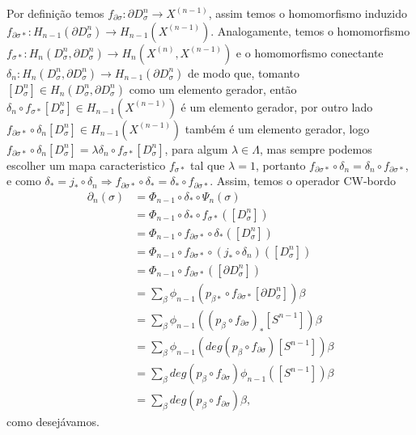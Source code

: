 \documentclass[12pt]{book}
\newcommand{\celula}[2]{D^{#1}_{#2}}
\newcommand{\celulabordo}[2]{\partial D^{#1}_{#2}}
\newcommand{\homologia}[2]{H_{#1}(#2)}
\newcommand{\homologiarelcel}[3]{H_{#1}(D^{#2}_{#3}, \partial D^{#2}_{#3})}
\newcommand{\homologiarelskelesimpl}[2]{H_{#1}(X^{(#2)}, X^{(#2-1)})}
\newcommand{\skeleton}[1]{X^{(#1)}}
\begin{document}
{	Por definição temos $f_{\partial\sigma}: \celulabordo{n}{\sigma} \to \skeleton{n-1}$, assim temos o homomorfismo induzido $f_{\partial\sigma*}: \homologia{n-1}{\celulabordo{n}{\sigma} }\to \homologia{n-1}{\skeleton{n-1}}$. Analogamente, temos o homomorfismo $f_{\sigma*}:\homologiarelcel{n}{n}{\sigma} \to \homologiarelskelesimpl{n}{n}$ e o homomorfismo conectante $\delta_{n} : \homologiarelcel{n}{n}{\sigma} \to \homologia{n-1}{\celulabordo{n}{\sigma}}$ de modo que, tomanto $[\celula{n}{\sigma}] \in \homologiarelcel{n}{n}{\sigma}$ como um elemento gerador, então $\delta_{n}\circ f_{\sigma*}[\celula{n}{\sigma}] \in \homologia{n-1}{\skeleton{n-1}}$ é um elemento gerador, por outro lado $f_{\partial\sigma*}\circ \delta_{n}[\celula{n}{\sigma}] \in \homologia{n-1}{\skeleton{n-1}}$ também é um elemento gerador, logo $f_{\partial\sigma*}\circ \delta_{n}[\celula{n}{\sigma}] = \lambda \delta_{n}\circ f_{\sigma*}[\celula{n}{\sigma}]$, para algum $\lambda \in \Lambda$, mas sempre podemos escolher um mapa caracteristico $f_{\sigma *}$ tal que $\lambda = 1$, portanto $f_{\partial\sigma*}\circ \delta_{n} = \delta_{n}\circ f_{\partial\sigma*}$, e como $\delta_{*} = j_{*}\circ\delta_{n} \Rightarrow f_{\partial\sigma*}\circ \delta_{*} = \delta_{*}\circ f_{\partial\sigma*}$. Assim, temos o operador CW-bordo
	$$
	\begin{aligned}
	\partial_{n}(\sigma) &= \Phi_{n-1}\circ\delta_{*}\circ\Psi_{n}(\sigma)
	\\
	&= \Phi_{n-1}\circ\delta_{*}\circ f_{\sigma*}([\celula{n}{\sigma}])
	\\
	&= \Phi_{n-1}\circ f_{\partial\sigma*}\circ\delta_{*}([\celula{n}{\sigma}])
	\\
	&= \Phi_{n-1}\circ f_{\partial\sigma*}\circ (j_{*}\circ \delta_{n}) ([\celula{n}{\sigma}])
	\\
	&= \Phi_{n-1} \circ f_{\partial\sigma*}([\celulabordo{n}{\sigma}])
	\\
	&= \sum_{\beta} \phi_{n-1}(p_{\beta*}\circ f_{\partial\sigma*}[\celulabordo{n}{\sigma}])\beta
	\\
	&= \sum_{\beta} \phi_{n-1}((p_{\beta}\circ f_{\partial\sigma})_{*}[S^{n-1}])\beta
	\\
	&= \sum_{\beta} \phi_{n-1}(deg(p_{\beta}\circ f_{\partial\sigma})[S^{n-1}])\beta
	\\
	&= \sum_{\beta} deg(p_{\beta}\circ f_{\partial\sigma})\phi_{n-1}([S^{n-1}])\beta
	\\
	&= \sum_{\beta} deg(p_{\beta}\circ f_{\partial\sigma})\beta,
	\end{aligned}
	$$
	como desejávamos.}
\end{document}
